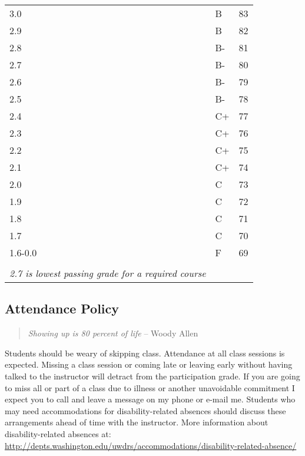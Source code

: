 \documentclass[11pt,]{article}
\begin{document}
\begin{table}[]
\begin{tabular}{lll}
3.0                           & B            & 83     \\
2.9                           & B            & 82     \\
2.8                           & B-           & 81     \\
2.7                           & B-           & 80     \\
2.6                           & B-           & 79     \\
2.5                           & B-           & 78     \\
2.4                           & C+           & 77     \\
2.3                           & C+           & 76     \\
2.2                           & C+           & 75     \\
2.1                           & C+           & 74     \\
2.0                           & C            & 73     \\
1.9                           & C            & 72     \\
1.8                           & C            & 71     \\
1.7                           & C            & 70     \\
1.6-0.0                       & F            & 69     \\
\\
\textit{2.7 is lowest passing grade for a required course}
\end{tabular}
\end{table}

\subsection{Attendance Policy}\label{attendance-policy}

\begin{quote}
\emph{Showing up is 80 percent of life} -- Woody Allen
\end{quote}

Students should be weary of skipping class. Attendance at all class
sessions is expected. Missing a class session or coming late or leaving
early without having talked to the instructor will detract from the
participation grade. If you are going to miss all or part of a class due
to illness or another unavoidable commitment I expect you to call and
leave a message on my phone or e-mail me. Students who may need
accommodations for disability-related absences should discuss these
arrangements ahead of time with the instructor. More information about
disability-related absences at:
\url{http://depts.washington.edu/uwdrs/accommodations/disability-related-absence/}
\end{document}
